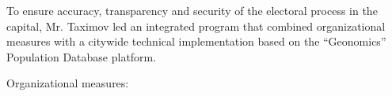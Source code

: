 To ensure accuracy, transparency and security of the electoral process in the capital, Mr. Taximov led an integrated program that combined organizational measures with a citywide technical implementation based on the ``Geonomics'' Population Database platform.

Organizational measures:

\vspace{-0.5\baselineskip}
